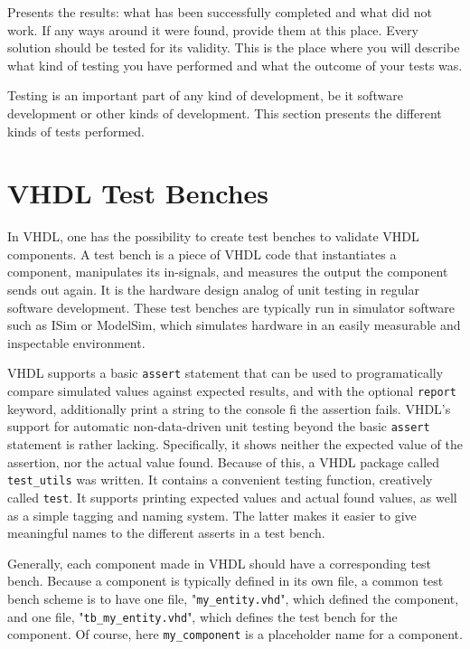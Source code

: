 Presents the results: what has been successfully completed and what did not work.
If any ways around it were found, provide them at this place.
Every solution should be tested for its validity.
This is the place where you will describe what kind of testing you have performed and what the outcome of your tests was.

Testing is an important part of any kind of development, be it software development or other kinds of development.
This section presents the different kinds of tests performed.

\section{VHDL Test Benches}

In VHDL, one has the possibility to create test benches to validate VHDL components.
A test bench is a piece of VHDL code that instantiates a component, manipulates its in-signals, and measures the output the component sends out again.
It is the hardware design analog of unit testing in regular software development.
These test benches are typically run in simulator software such as ISim or ModelSim, which simulates hardware in an easily measurable and inspectable environment.

VHDL supports a basic \texttt{assert} statement that can be used to programatically compare simulated values against expected results, and with the optional \texttt{report} keyword, additionally print a string to the console fi the assertion fails.
VHDL's support for automatic non-data-driven unit testing beyond the basic \texttt{assert} statement is rather lacking.
Specifically, it shows neither the expected value of the assertion, nor the actual value found.
Because of this, a VHDL package called \texttt{test\_utils} was written.
It contains a convenient testing function, creatively called \texttt{test}.
It supports printing expected values and actual found values, as well as a simple tagging and naming system.
The latter makes it easier to give meaningful names to the different asserts in a test bench.

Generally, each component made in VHDL should have a corresponding test bench.
Because a component is typically defined in its own file, a common test bench scheme is to have one file, "\texttt{my\_entity.vhd}", which defined the component, and one file, "\texttt{tb\_my\_entity.vhd}", which defines the test bench for the component.
Of course, here \texttt{my\_component} is a placeholder name for a component.

